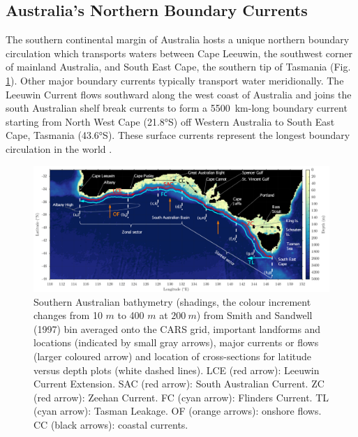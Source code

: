 \documentclass[preprint,3p,review,12pt]{elsarticle}
\begin{document}
\subsection{Australia's Northern Boundary Currents} \label{Australia's Northern Boundary Currents}
The southern continental margin of Australia hosts a unique northern boundary circulation which transports waters between Cape Leeuwin, the southwest corner of mainland Australia, and South East Cape, the southern tip of Tasmania (Fig.\,\ref{f01_fig1_}). Other major boundary currents typically transport water meridionally. The Leeuwin Current flows southward along the west coast of Australia and joins the south Australian shelf break currents to form a \SI{5500}{km}-long boundary current starting from North West Cape (\ang{21.8}S) off Western Australia to South East Cape, Tasmania (\ang{43.6}S). These surface currents represent the longest boundary circulation in the world \citep{Middleton2007,Ridgway2004}.
%
\begin{figure}[h]
\noindent\includegraphics[width=1\textwidth, height=0.89\textheight, keepaspectratio]
{f01_fig1_.png}
\caption{\label{f01_fig1_}%
  Southern Australian bathymetry (shadings, the colour increment changes from 10 $m$ to 400 $m$ at $200\ m$) from Smith and Sandwell (1997) bin averaged onto the CARS grid, important landforms and locations (indicated by small gray arrows), major currents or flows (larger coloured arrow) and location of cross-sections for latitude versus depth plots (white dashed lines). LCE (red arrow): Leeuwin Current Extension. SAC (red arrow): South Australian Current. ZC (red arrow): Zeehan Current. FC (cyan arrow): Flinders Current. TL (cyan arrow): Tasman Leakage. OF (orange arrows): onshore flows. CC (black arrows): coastal currents.}
\end{figure}
\end{document}
